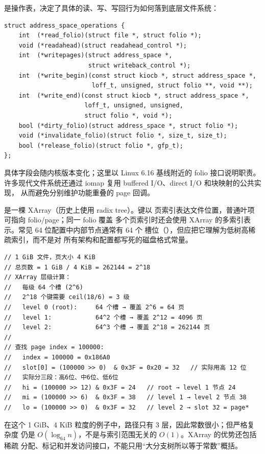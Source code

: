\begin{filesystemlayout}
 是操作表，决定了具体的读、写、写回行为如何落到底层文件系统：

\begin{lstlisting}
struct address_space_operations {
    int  (*read_folio)(struct file *, struct folio *);
    void (*readahead)(struct readahead_control *);
    int  (*writepages)(struct address_space *,
                       struct writeback_control *);
    int  (*write_begin)(const struct kiocb *, struct address_space *,
                        loff_t, unsigned, struct folio **, void **);
    int  (*write_end)(const struct kiocb *, struct address_space *,
                      loff_t, unsigned, unsigned,
                      struct folio *, void *);
    bool (*dirty_folio)(struct address_space *, struct folio *);
    void (*invalidate_folio)(struct folio *, size_t, size_t);
    bool (*release_folio)(struct folio *, gfp_t);
};
\end{lstlisting}

具体字段会随内核版本变化；这里以 Linux 6.16 基线附近的 folio 接口说明职责。
许多现代文件系统还通过 iomap 复用 buffered I/O、direct I/O 和块映射的公共实现，
从而避免分别维护功能重叠的 page 回调。


 是一棵 XArray（历史上使用 radix tree）。键以
 页索引表达文件位置，普通叶项可指向 folio/page；同一 folio 覆盖
多个页索引时还会使用 XArray 的多索引表示。常见 64 位配置中内部节点通常有 64 个
槽位（），但应把它理解为低树高稀疏索引，而不是对
所有架构和配置都写死的磁盘格式常量。

\begin{lstlisting}
// 1 GiB 文件，页大小 4 KiB
// 总页数 = 1 GiB / 4 KiB = 262144 = 2^18
// XArray 层级计算：
//   每级 64 个槽 (2^6)
//   2^18 个键需要 ceil(18/6) = 3 级
//   level 0 (root):     64 个槽 → 覆盖 2^6 = 64 页
//   level 1:            64^2 个槽 → 覆盖 2^12 = 4096 页
//   level 2:            64^3 个槽 → 覆盖 2^18 = 262144 页
//
// 查找 page index = 100000:
//   index = 100000 = 0x186A0
//   slot[0] = (100000 >> 0)  & 0x3F = 0x20 = 32   // 实际用高 12 位
//   实际分三段：高6位、中6位、低6位
//   hi = (100000 >> 12) & 0x3F = 24   // root → level 1 节点 24
//   mi = (100000 >> 6)  & 0x3F = 38   // level 1 → level 2 节点 38
//   lo = (100000 >> 0)  & 0x3F = 32   // level 2 → slot 32 = page*
\end{lstlisting}

在这个 1 GiB、4 KiB 粒度的例子中，路径只有 3 层，因此常数很小；但严格复杂度
仍是 $O(\log_{64} n)$，不是与索引范围无关的 $O(1)$。XArray 的优势还包括稀疏
分配、标记和并发访问接口，不能只用“大分支树所以等于常数”概括。


\end{filesystemlayout}
